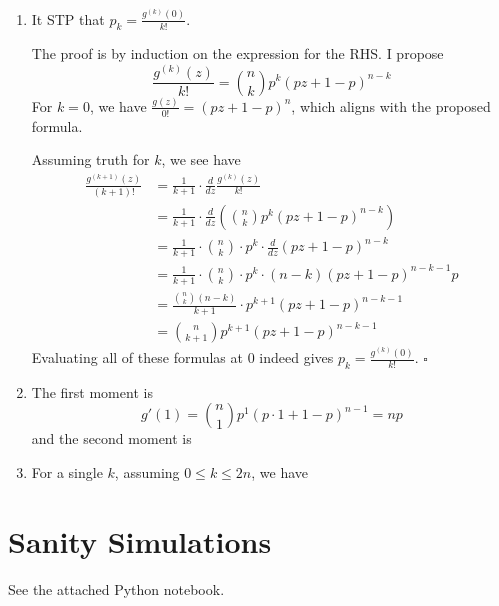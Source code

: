 \documentclass[12pt]{article}
\begin{document}
\begin{enumerate}
      \item It STP that $p_k=\frac{g^{(k)}(0)}{k!}$.

            The proof is by induction on the expression for the RHS.
            I propose
            \[\frac{g^{(k)}(z)}{k!}=\binom{n}{k}p^k(pz+1-p)^{n-k}\]
            For $k=0$, we have $\frac{g(z)}{0!}=(pz+1-p)^n$, which aligns with the proposed formula.

            Assuming truth for $k$, we see have
            \begin{align*}
                  \frac{g^{(k+1)}(z)}{(k+1)!}
                   & = \frac{1}{k+1} \cdot \frac{d}{dz} \frac{g^{(k)}(z)}{k!}                       \\
                   & = \frac{1}{k+1} \cdot \frac{d}{dz} \left(\binom{n}{k}p^k(pz+1-p)^{n-k}\right)  \\
                   & = \frac{1}{k+1} \cdot \binom{n}{k} \cdot p^k \cdot \frac{d}{dz} (pz+1-p)^{n-k} \\
                   & = \frac{1}{k+1} \cdot \binom{n}{k} \cdot p^k \cdot (n-k)(pz+1-p)^{n-k-1}p      \\
                   & = \frac{\binom{n}{k} (n-k)}{k+1} \cdot p^{k+1}(pz+1-p)^{n-k-1}                 \\
                   & = \binom{n}{k+1}p^{k+1}(pz+1-p)^{n-k-1}
            \end{align*}
            Evaluating all of these formulas at $0$ indeed gives $p_k=\frac{g^{(k)}(0)}{k!}$. $\square$

      \item The first moment is
            \[g'(1)=\binom{n}{1}p^1(p \cdot 1+1-p)^{n-1}=np\]
            and the second moment is

      \item For a single $k$, assuming $0 \le k \le 2n$, we have
\end{enumerate}

\section{Sanity Simulations}

See the attached Python notebook.
\end{document}

